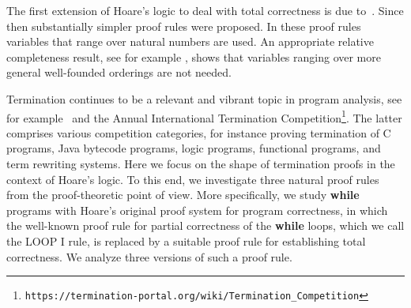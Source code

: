 \documentclass[runningheads]{llncs}       %
\begin{document}
The first extension of Hoare's logic
to deal with total correctness is due to~\cite{MP74}. 
Since then substantially simpler proof rules were proposed.
In these proof rules variables that range over natural numbers are used.
An appropriate relative completeness result, see for example \cite{ABO09}, 
shows that variables ranging over more general well-founded orderings 
are not needed.

Termination continues to be a relevant and vibrant topic in program
analysis, see for example~\cite{CookPR11} and the Annual International
Termination Competition\footnote{
\texttt{https://termination-portal.org/wiki/Termination\_Competition}}.
The latter comprises various competition categories, 
for instance proving termination of 
C programs, Java bytecode programs, logic programs,
functional programs, and term rewriting systems.
Here we focus on the shape of termination proofs in the context of
Hoare's logic. 
To this end, we investigate three natural proof rules 
from the proof-theoretic point of view.
More specifically, we study {\bf while} programs with Hoare's 
original proof system for program correctness, in which the well-known
proof rule for partial correctness of the {\bf while} loops, which we
call the LOOP I rule, is replaced by a suitable proof rule for
establishing total correctness.  We analyze three versions of such a
proof rule. 


\medskip
\end{document}
